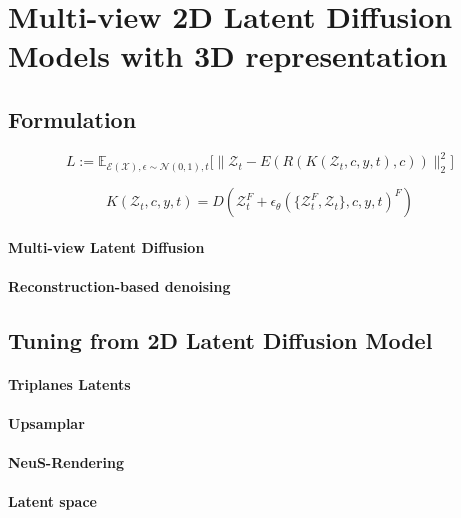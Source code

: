 \documentclass{article}
\theoremstyle{plain}
\theoremstyle{definition}
\theoremstyle{remark}
\begin{document}
\section{Multi-view 2D Latent Diffusion Models with 3D representation}


\subsection{Formulation}

\begin{equation}
L:=\mathbb{E}_{
\mathcal{E}(\mathcal{X}),\epsilon\sim\mathcal{N}(0,1),t}
\Big[\|\mathcal{Z}_t - 
E(R(K(\mathcal{Z}_t,c,y,t), c))\|_2^2\Big]
\label{eq.2}
\end{equation}


\begin{equation}
K(\mathcal{Z}_t,c,y,t) = D( \mathcal{Z}_{t}^F + \epsilon_\theta(\{\mathcal{Z}_{t}^F, \mathcal{Z}_t\},c,y,t)^F)
\label{eq.2}
\end{equation}

\paragraph{Multi-view Latent Diffusion}

\paragraph{Reconstruction-based denoising}


\subsection{Tuning from 2D Latent Diffusion Model}

\paragraph{Triplanes Latents}

\paragraph{Upsamplar}

\paragraph{NeuS-Rendering}

\paragraph{Latent space}
\end{document}
